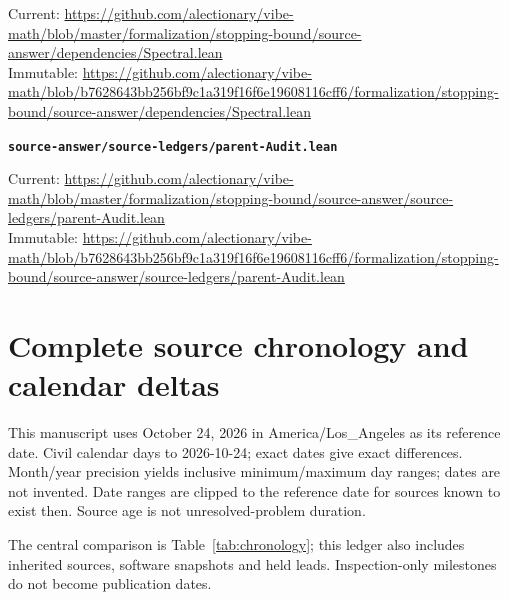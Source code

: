 {\footnotesize\noindent Current: \url{https://github.com/alectionary/vibe-math/blob/master/formalization/stopping-bound/source-answer/dependencies/Spectral.lean}\\
Immutable: \url{https://github.com/alectionary/vibe-math/blob/b7628643bb256bf9c1a319f16f6e19608116cff6/formalization/stopping-bound/source-answer/dependencies/Spectral.lean}\par}
\smallskip
\medskip
\par\noindent\textbf{\texttt{source-answer/source-ledgers/parent-Audit.lean}}\par\nopagebreak
{\footnotesize\noindent Current: \url{https://github.com/alectionary/vibe-math/blob/master/formalization/stopping-bound/source-answer/source-ledgers/parent-Audit.lean}\\
Immutable: \url{https://github.com/alectionary/vibe-math/blob/b7628643bb256bf9c1a319f16f6e19608116cff6/formalization/stopping-bound/source-answer/source-ledgers/parent-Audit.lean}\par}
\smallskip
\clearpage\section{Complete source chronology and calendar deltas}\label{app:chronology}
This manuscript uses October 24, 2026 in America/Los\_Angeles as its reference date. Civil calendar days to 2026-10-24; exact dates give exact differences. Month/year precision yields inclusive minimum/maximum day ranges; dates are not invented. Date ranges are clipped to the reference date for sources known to exist then. Source age is not unresolved-problem duration.

The central comparison is Table~\ref{tab:chronology}; this ledger also includes inherited sources, software snapshots and held leads. Inspection-only milestones do not become publication dates.

